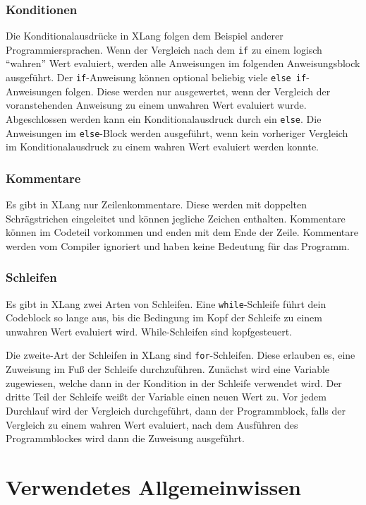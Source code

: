 \documentclass[a4paper]{article}
\begin{document}
\subsubsection{Konditionen}

Die Konditionalausdrücke in XLang folgen dem Beispiel anderer Programmiersprachen.
Wenn der Vergleich nach dem \texttt{if} zu einem logisch \enquote{wahren} Wert evaluiert, werden
alle Anweisungen im folgenden Anweisungsblock ausgeführt.
Der \texttt{if}-Anweisung können optional beliebig viele \texttt{else if}-Anweisungen folgen.
Diese werden nur ausgewertet, wenn der Vergleich der voranstehenden Anweisung zu einem unwahren Wert
evaluiert wurde.
Abgeschlossen werden kann ein Konditionalausdruck durch ein \texttt{else}. Die Anweisungen im
\texttt{else}-Block werden ausgeführt, wenn kein vorheriger Vergleich im Konditionalausdruck zu
einem wahren Wert evaluiert werden konnte.

\subsubsection{Kommentare}

Es gibt in XLang nur Zeilenkommentare. Diese werden mit doppelten Schrägstrichen eingeleitet und
können jegliche Zeichen enthalten.
Kommentare können im Codeteil vorkommen und enden mit dem Ende der Zeile.
Kommentare werden vom Compiler ignoriert und haben keine Bedeutung für das Programm.

\subsubsection{Schleifen}

Es gibt in XLang zwei Arten von Schleifen. Eine \texttt{while}-Schleife führt dein Codeblock so
lange aus, bis die Bedingung im Kopf der Schleife zu einem unwahren Wert evaluiert wird.
While-Schleifen sind kopfgesteuert.

Die zweite-Art der Schleifen in XLang sind \texttt{for}-Schleifen. Diese erlauben es, eine Zuweisung
im Fuß der Schleife durchzuführen. Zunächst wird eine Variable zugewiesen, welche dann in der
Kondition in der Schleife verwendet wird. Der dritte Teil der Schleife weißt der Variable einen
neuen Wert zu. Vor jedem Durchlauf wird der Vergleich durchgeführt, dann der Programmblock, falls
der Vergleich zu einem wahren Wert evaluiert, nach dem Ausführen des Programmblockes wird dann die
Zuweisung ausgeführt.


\section{Verwendetes Allgemeinwissen}
\end{document}
